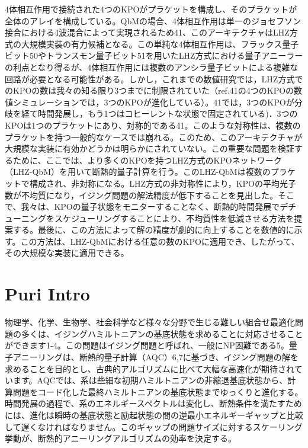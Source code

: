 4体相互作用で接続された4つのKPOがプラケットを構成し、そのプラケットが全体のアレイを構成している。QbMの場合、4体相互作用は単一のジョセフソン接合における4波混合によって実現されるため41、このアーキテクチャはLHZ方式の大規模実装の有力候補となる。この単純な4体相互作用は、フラックス量子ビット50やトランスモン量子ビット51を用いたLHZ方式における量子アニーラーの利点となり得るが、4体相互作用には複数のアンシラ量子ビットによる複雑な回路が必要となる可能性がある。しかし，これまでの数値研究では，LHZ方式でのKPOの数は我々の知る限り3つまでに制限されていた（ref.41の4つのKPOの数値シミュレーションでは，3つのKPOが進化している）。41では，3つのKPOが分岐を経て時間発展し，もう1つはコヒーレントな状態で固定されている)．3つのKPOは1つのプラケットにあり、対称的である41。このような対称性は、複数のプラケットを持つ一般的なケースでは崩れる。このため、このアーキテクチャが大規模な実装に有効かどうかは明らかにされていない。この重要な問題を検証するために、ここでは、より多くのKPOを持つLHZ方式のKPOネットワーク（LHZ-QbM）を用いて断熱的量子計算を行う。このLHZ-QbMは複数のプラケットで構成され、非対称になる。LHZ方式の非対称性により，KPOの平均光子数が不均質になり，イジング問題の解法精度が低下することを見出した。そこで、我々は、KPOの量子状態をモニターすることなく、断熱的時間発展でデチューニングをスケジューリングすることにより、不均質性を低減させる方法を提案する。最後に、この方法によって解の精度が劇的に向上することを数値的に示す。この方法は、LHZ-QbMにおける任意の数のKPOに適用でき、したがって、その大規模な実装に適用できる。








\section{Puri Intro}




物理学、化学、生物学、社会科学など様々な分野で生じる難しい組合せ最適化問題の多くは、イジングハミルトニアンの基底状態を求めることに対応させることができます1-4。この問題はイジング問題と呼ばれ、一般にNP困難である5。量子アニーリングは、断熱的量子計算（AQC）6,7に基づき、イジング問題の解を求めることを目的とし、古典的アルゴリズムに比べて大幅な高速化が期待されています。AQCでは、系は些細な初期ハミルトニアンの非縮退基底状態から、計算問題をコード化した最終ハミルトニアンの基底状態までゆっくりと進化する。時間発展の過程で、系のエネルギースペクトルは変化し、断熱条件を満たすためには、進化は瞬時の基底状態と励起状態の間の逆最小エネルギーギャップと比較して遅くなければなりません。このギャップの問題サイズに対するスケーリング挙動が、断熱的アニーリングアルゴリズムの効率を決定する。

